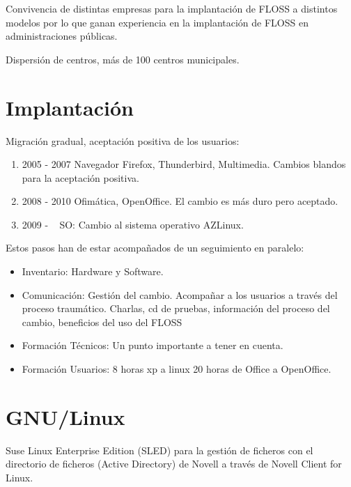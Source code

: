 \documentclass[11pt]{scrartcl}
\begin{document}
\par Convivencia de distintas empresas para la implantaci\'on de FLOSS a distintos modelos por lo que ganan experiencia en la implantaci\'on de FLOSS en administraciones p\'ublicas.

\par Dispersi\'on de centros, m\'as de 100 centros municipales.


\section{Implantaci\'on}
\label{sec:implantacion}

\par Migraci\'on gradual, aceptaci\'on positiva de los usuarios:
\begin{enumerate}
	\item 2005 - 2007 Navegador Firefox, Thunderbird, Multimedia. Cambios blandos para la aceptaci\'on positiva.
	\item 2008 - 2010 Ofim\'atica, OpenOffice. El cambio es m\'as duro pero aceptado.
	\item 2009 - ~ SO: Cambio al sistema operativo AZLinux.
\end{enumerate}

\par Estos pasos han de estar acompa\~nados de un seguimiento en paralelo:
\begin{itemize}
	\item Inventario: Hardware y Software.
	\item Comunicaci\'on: Gesti\'on del cambio. Acompa\~nar a los usuarios a trav\'es del proceso traum\'atico. Charlas, cd de pruebas, informaci\'on del proceso del cambio, beneficios del uso del FLOSS
	\item Formaci\'on T\'ecnicos: Un punto importante a tener en cuenta.
	\item Formaci\'on Usuarios: 8 horas xp a linux 20 horas de Office a OpenOffice.
\end{itemize}


\section{GNU/Linux}
\label{sec:gnu-linux}

\par Suse Linux Enterprise Edition (SLED) para la gesti\'on de ficheros con el directorio de ficheros (Active Directory) de Novell a trav\'es de Novell Client for Linux.
\end{document}
